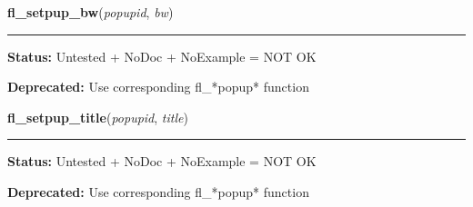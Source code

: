     \vspace{0.5ex}

\hspace{.8\funcindent}\begin{boxedminipage}{\funcwidth}

    \raggedright \textbf{fl\_setpup\_bw}(\textit{popupid}, \textit{bw})

    \vspace{-1.5ex}

    \rule{\textwidth}{0.5\fboxrule}
\setlength{\parskip}{2ex}
\setlength{\parskip}{1ex}
\textbf{Status:} Untested + NoDoc + NoExample = NOT OK



\textbf{Deprecated:} Use corresponding fl\_*popup* function



    \end{boxedminipage}

    \label{xformslib:deprecated:fl_setpup_title}

    \vspace{0.5ex}

\hspace{.8\funcindent}\begin{boxedminipage}{\funcwidth}

    \raggedright \textbf{fl\_setpup\_title}(\textit{popupid}, \textit{title})

    \vspace{-1.5ex}

    \rule{\textwidth}{0.5\fboxrule}
\setlength{\parskip}{2ex}
\setlength{\parskip}{1ex}
\textbf{Status:} Untested + NoDoc + NoExample = NOT OK



\textbf{Deprecated:} Use corresponding fl\_*popup* function



    \end{boxedminipage}

    \label{xformslib:deprecated:fl_setpup_entercb}

    \vspace{0.5ex}

